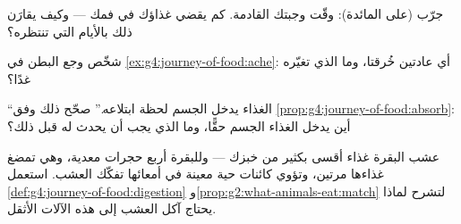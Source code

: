 \begin{exercise}[$\star$]\label{exo:g4:journey-of-food:8}
جرّب (على المائدة): وقّت وجبتك القادمة. كم يقضي غذاؤك في فمك ---
وكيف يقارَن ذلك بالأيام التي تنتظره؟
\end{exercise}

\begin{exercise}[$\star\star$]\label{exo:g4:journey-of-food:9}
شخّص وجع البطن في \cref{ex:g4:journey-of-food:ache}: أي عادتين
خُرقتا، وما الذي تغيّره غدًا؟
\end{exercise}

\begin{exercise}[$\star\star$]\label{exo:g4:journey-of-food:10}
``الغذاء يدخل الجسم لحظة ابتلاعه.'' صحّح ذلك وفق
\cref{prop:g4:journey-of-food:absorb}: أين يدخل الغذاء الجسم
حقًّا، وما الذي يجب أن يحدث له قبل ذلك؟
\end{exercise}

\begin{exercise}[$\star\star\star$]\label{exo:g4:journey-of-food:11}
عشب البقرة غذاء أقسى بكثير من خبزك --- وللبقرة أربع حجرات معدية،
وهي تمضغ غذاءها مرتين، وتؤوي كائنات حية معينة في أمعائها تفكّك
العشب. استعمل \cref{def:g4:journey-of-food:digestion}
و\cref{prop:g2:what-animals-eat:match} لتشرح لماذا يحتاج آكل العشب
إلى هذه الآلات الأثقل.
\end{exercise}
